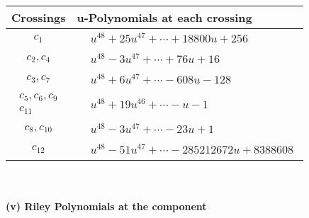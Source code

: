 \documentclass[1p]{elsarticle_modified}
\theoremstyle{definition}
\begin{document}
\begin{tabular}{m{50pt}|m{274pt}}
Crossings & \hspace{64pt}u-Polynomials at each crossing \\
\hline $$\begin{aligned}c_{1}\end{aligned}$$&$\begin{aligned}
&u^{48}+25 u^{47}+\cdots+18800 u+256
\end{aligned}$\\
\hline $$\begin{aligned}c_{2},c_{4}\end{aligned}$$&$\begin{aligned}
&u^{48}-3 u^{47}+\cdots+76 u+16
\end{aligned}$\\
\hline $$\begin{aligned}c_{3},c_{7}\end{aligned}$$&$\begin{aligned}
&u^{48}+6 u^{47}+\cdots-608 u-128
\end{aligned}$\\
\hline $$\begin{aligned}c_{5},c_{6},c_{9}\\c_{11}\end{aligned}$$&$\begin{aligned}
&u^{48}+19 u^{46}+\cdots- u-1
\end{aligned}$\\
\hline $$\begin{aligned}c_{8},c_{10}\end{aligned}$$&$\begin{aligned}
&u^{48}-3 u^{47}+\cdots-23 u+1
\end{aligned}$\\
\hline $$\begin{aligned}c_{12}\end{aligned}$$&$\begin{aligned}
&u^{48}-51 u^{47}+\cdots-285212672 u+8388608
\end{aligned}$\\
\hline
\end{tabular}\\~\\
\newpage\renewcommand{\arraystretch}{1}
\flushleft \textbf{(v) Riley Polynomials at the component}\newline \\
\end{document}
